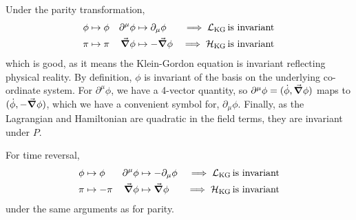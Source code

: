 \documentclass[notes.tex]{subfiles}
\begin{document}
Under the parity transformation,
\begin{align*}
 \phi &\mapsto \phi &\partial^\mu \phi &\mapsto \partial_\mu \phi & \implies \mathcal{L}_{\mathrm{KG}}\,& \textrm{is invariant}\\
 \pi &\mapsto \pi & \grad\phi &\mapsto -\grad\phi &\implies \mathcal{H}_{\mathrm{KG}}\,& \textrm{is invariant}
\end{align*}
which is good, as it means the Klein-Gordon equation is invariant reflecting physical reality.
By definition, $\phi$ is invariant of the basis on the underlying co-ordinate system. For $\partial^\mu \phi$, we have a 4-vector quantity, so $\partial^\mu \phi = (\dot\phi, \grad\phi)$ maps to $(\dot\phi, -\grad\phi)$, which we have a convenient symbol for, $\partial_\mu \phi$. Finally, as the Lagrangian and Hamiltonian are quadratic in the field terms, they are invariant under $P$.

For time reversal,
\begin{align*}
  \phi &\mapsto \phi &\partial^\mu \phi &\mapsto -\partial_\mu \phi & \implies \mathcal{L}_{\mathrm{KG}}\,& \textrm{is invariant}\\
  \pi &\mapsto -\pi & \grad\phi &\mapsto \grad\phi &\implies \mathcal{H}_{\mathrm{KG}}\,& \textrm{is invariant}
\end{align*}
under the same arguments as for parity.
\end{document}
